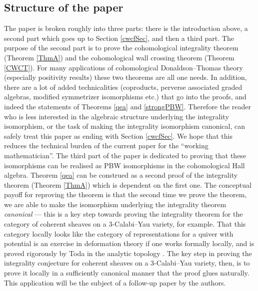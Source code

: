 \documentclass[a4paper,10pt]{amsart}
\begin{document}
\subsection{Structure of the paper}
The paper is broken roughly into three parts: there is the introduction above, a second part which goes up to Section \ref{cwcfSec}, and then a third part.  The purpose of the second part is to prove the cohomological integrality theorem (Theorem \ref{ThmA}) and the cohomological wall crossing theorem  (Theorem \ref{CWCT}).  For many applications of cohomological Donaldson--Thomas theory (especially positivity results) these two theorems are all one needs.  In addition, there are a lot of added technicalities (coproducts, perverse associated graded algebras, modified symmetrizer isomorphisms etc.) that go into the proofs, and indeed the statements of Theorems \ref{qea} and \ref{strongPBW}.  Therefore the reader who is less interested in the algebraic structure underlying the integrality isomorphism, or the task of making the integrality isomorphism canonical, can safely treat this paper as ending with Section \ref{cwcfSec}.  We hope that this reduces the technical burden of the current paper for the ``working mathematician''.
\smallbreak
The third part of the paper is dedicated to proving that these isomorphisms can be realised as PBW isomorphisms in the cohomological Hall algebra.  Theorem \ref{qea} can be construed as a second proof of the integrality theorem (Theorem \ref{ThmA}) which is dependent on the first one.  The conceptual payoff for reproving the theorem is that the second time we prove the theorem, we are able to make the isomorphism underlying the integrality theorem \textit{canonical} --- this is a key step towards proving the integrality theorem for the category of coherent sheaves on a 3-Calabi--Yau variety, for example.  That this category locally looks like the category of representations for a quiver with potential is an exercise in deformation theory if one works formally locally, and is proved rigorously by Toda in the analytic topology \cite{Toda17-2}.  The key step in proving the integrality conjecture for coherent sheaves on a 3-Calabi--Yau variety, then, is to prove it locally in a sufficiently canonical manner that the proof glues naturally.  This application will be the subject of a follow-up paper by the authors.
\end{document}
